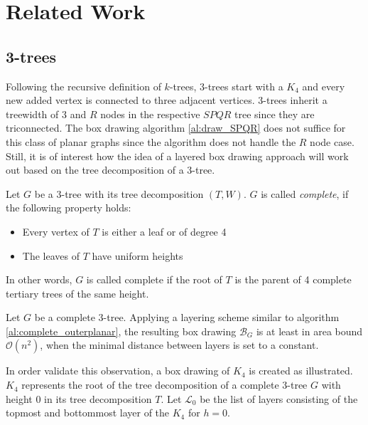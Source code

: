 \section{Related Work}\label{section:related_work}

\subsection{3-trees}

Following the recursive definition of $k$-trees, 3-trees start with a $K_4$ and every new added vertex is connected to three adjacent vertices. 3-trees inherit a treewidth of 3 and $R$ nodes in the respective $SPQR$ tree since they are triconnected. The box drawing algorithm \ref{al:draw_SPQR} does not suffice for this class of planar graphs since the algorithm does not handle the $R$ node case. Still, it is of interest how the idea of a layered box drawing approach will work out based on the tree decomposition of a 3-tree.

\begin{definition}
	Let $G$ be a 3-tree with its tree decomposition $(T,W)$. $G$ is called \emph{complete}, if the following property holds:
	\begin{itemize}
		\item Every vertex of $T$ is either a leaf or of degree 4
		\item The leaves of $T$ have uniform heights
	\end{itemize}
	In other words, $G$ is called complete if the root of $T$ is the parent of 4 complete tertiary trees of the same height.
\end{definition}

\begin{observation}
	Let $G$ be a complete 3-tree. Applying a layering scheme similar to algorithm \ref{al:complete_outerplanar}, the resulting box drawing $\mathcal{B}_G$ is at least in area bound $\mathcal{O}(n^2)$, when the minimal distance between layers is set to a constant.
\end{observation}

In order validate this observation, a box drawing of $K_4$ is created as illustrated. $K_4$ represents the root of the tree decomposition of a complete 3-tree $G$ with height 0 in its tree decomposition $T$. Let $\mathcal{L}_0$ be the list of layers consisting of the topmost and bottommost layer of the $K_4$ for $h=0$.

